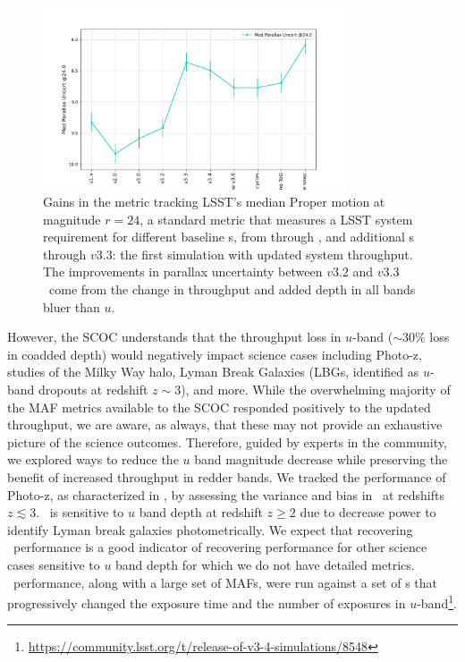 \begin{figure}
    \centering

\includegraphics[width=0.8\textwidth]{figures/baseline_parallax.png}
\caption{Gains in the metric tracking LSST's median Proper motion at magnitude $r=24$, a standard metric that measures a LSST  system requirement for different $\mathrm{baseline}$ \opsim s, from  through , and additional \opsim s  through $v3.3$: the first simulation with updated system throughput. The improvements in parallax uncertainty between $v3.2$ and $v3.3$ \opsim\ come from the change in throughput and added depth in all bands bluer than $u$. }
\label{fig:parallax}
\end{figure}

However, the SCOC understands that the throughput loss in $u$-band ($\sim30\%$  loss in coadded depth) would negatively impact science cases including Photo-z, studies of the Milky Way halo, Lyman Break Galaxies (LBGs, identified as $u$-band dropouts at redshift $z\sim3$), and more. While the overwhelming majority of the MAF metrics available to the SCOC responded positively to the updated throughput, we are aware, as always, that these may not provide an exhaustive picture of the science outcomes. Therefore, guided by experts in the community, we explored ways to reduce the $u$ band magnitude decrease while preserving the benefit of increased throughput in redder bands. 
We tracked the performance of Photo-z, as characterized in \citealt{Graham_2017}, by assessing the variance and bias in \pz\ at redshifts $z\lesssim{3}$. \pz\ is sensitive to $u$ band depth at redshift $z\geq 2$ due to decrease power to identify Lyman break galaxies photometrically. We expect that recovering \pz\ performance is a good indicator of recovering performance for other science cases sensitive to $u$ band depth for which we do not have detailed metrics. \pz\ performance, along with a large set of MAFs, were run against a set of \opsim s  that progressively changed the exposure time and the number of exposures in $u$-band\footnote{\url{https://community.lsst.org/t/release-of-v3-4-simulations/8548}}. 

